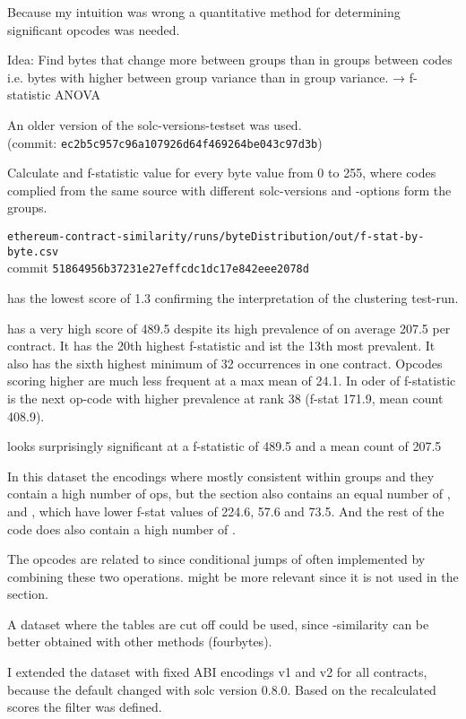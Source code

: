 \documentclass[../main.tex]{subfiles}
\begin{document}
Because my intuition was wrong a quantitative method for determining significant opcodes was needed.

Idea: Find bytes that change more between groups than in groups between codes i.e. bytes with higher between group variance than in group variance. → f-statistic ANOVA

An older version of the solc-versions-testset \cite{solc-versions-testset} was used.\\
(commit: \texttt{ec2b5c957c96a107926d64f469264be043c97d3b})

Calculate and f-statistic value for every byte value from 0 to 255, where codes complied from the same source with different solc-versions and -options form the groups.

\texttt{ethereum-contract-similarity/runs/byteDistribution/out/f-stat-by-byte.csv}\\
commit \texttt{51864956b37231e27effcdc1dc17e842eee2078d}

 has the lowest score of 1.3 confirming the interpretation of the clustering test-run.

 has a very high score of 489.5 despite its high prevalence of on average 207.5 per contract. It has the 20th highest f-statistic and ist the 13th most prevalent. It also has the sixth highest minimum of 32 occurrences in one contract. Opcodes scoring higher are much less frequent at a max mean of 24.1. In oder of f-statistic  is the next op-code with higher prevalence at rank 38 (f-stat 171.9, mean count 408.9).

 looks surprisingly significant at a f-statistic of 489.5 and a mean count of 207.5

In this dataset the  encodings where mostly consistent within groups and they contain a high number of  ops, but the  section also contains an equal number of ,  and , which have lower f-stat values of 224.6, 57.6 and 73.5. And the rest of the code does also contain a high number of .

The  opcodes are related to  since conditional jumps of often implemented by combining these two operations.  might be more relevant since it is not used in the  section.

A dataset where the  tables are cut off could be used, since -similarity can be better obtained with other methods (fourbytes).

I extended the dataset with fixed ABI encodings v1 and v2 for all contracts, because the default changed with solc version 0.8.0.
Based on the recalculated scores the  filter was defined.
\end{document}
